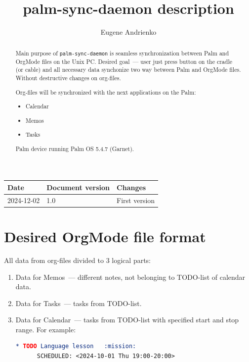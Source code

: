 \documentclass[a4paper,12pt,oneside]{scrartcl}
\title{palm-sync-daemon description}
\author{Eugene Andrienko}
\begin{document}
\clearpage
\maketitle
\thispagestyle{empty}
\newpage

\pagestyle{fancy}
\lhead{}
\chead{}
\lfoot{}
\rfoot{}


\tableofcontents
\listoffigures
\listoftables
\lstlistoflistings

\newpage

\begin{tabular}{|l|l|l|}
  \hline
  \textbf{Date} & \textbf{Document version} & \textbf{Changes} \\
  \hline
  2024-12-02 & 1.0 & First version \\
  \hline
\end{tabular}

\newpage


\begin{abstract}
  Main purpose of \texttt{palm-sync-daemon} is seamless synchronization between
  Palm and OrgMode files on the Unix PC. Desired goal~--- user just press button
  on the cradle (or cable) and all necessary data synchonize two way between
  Palm and OrgMode files. Without destructive changes on org-files.

  Org-files will be synchronized with the next applications on the Palm:
  \begin{itemize}
  \item Calendar
  \item Memos
  \item Tasks
  \end{itemize}

  Palm device running Palm OS 5.4.7 (Garnet).
\end{abstract}

\section{Desired OrgMode file format}
\label{sec:desired-orgmode-file}

All data from org-files divided to 3 logical parts:
\begin{enumerate}
\item Data for Memos~--- different notes, not belonging to TODO-list of calendar
  data.
\item Data for Tasks~--- tasks from TODO-list.
\item Data for Calendar~--- tasks from TODO-list with specified start and stop
  range. For example:
  \begin{lstlisting}[language=org]
    * TODO Language lesson   :mission:
      SCHEDULED: <2024-10-01 Thu 19:00-20:00>
  \end{lstlisting}
\end{enumerate}
\end{document}
